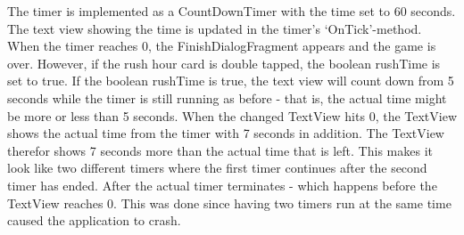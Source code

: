 \newpage
The timer is implemented as a CountDownTimer with the time set to 60 seconds. The text view showing the time is updated in the timer’s ‘OnTick’-method.  When the timer reaches 0, the FinishDialogFragment appears and the game is over. However, if the rush hour card is double tapped, the boolean rushTime is set to true. If the boolean rushTime is true, the text view will count down from 5 seconds while the timer is still running as before - that is, the actual time might be more or less than 5 seconds. When the changed TextView hits 0, the TextView shows the actual time from the timer with 7 seconds in addition. The TextView therefor shows 7 seconds more than the actual time that is left. This makes it look like two different timers where the first timer continues after the second timer has ended. After the actual timer terminates - which happens before the TextView reaches 0. This was done since having two timers run at the same time caused the application to crash.



